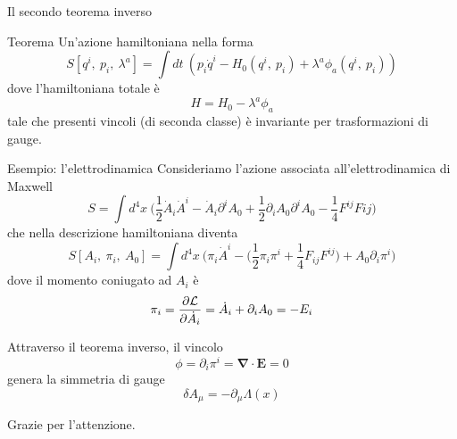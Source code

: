 \begin{frame}{Il secondo teorema inverso}
    \begin{block}{Teorema}
        Un'azione hamiltoniana nella forma
    \begin{equation*} 
        S[q^i,~p_i,~\lambda^a] = \int dt ~ (p_i \dot q^i - H_0(q^i, ~p_i) + \lambda^a \phi_a (q^i, ~p_i))
    \end{equation*} 
        dove l'hamiltoniana totale è 
    \begin{equation*}
        H = H_0 - \lambda^a \phi_a
    \end{equation*} 
        tale che presenti vincoli (di seconda classe) è invariante per trasformazioni di gauge.
    \end{block}
\end{frame}

\begin{frame} {Esempio: l'elettrodinamica}
    Consideriamo l'azione associata all'elettrodinamica di Maxwell
    \begin{equation*}
        S = \int d^4 x ~ \Big (\frac{1}{2} \dot A_i \dot A^i - \dot A_i \partial^i A_0 + \frac{1}{2} \partial_i A_0 \partial^i A_0 - \frac{1}{4} F^{ij} F{ij} \Big )
    \end{equation*}
    che nella descrizione hamiltoniana diventa
    \begin{equation*}
        S[A_i, ~\pi_i, ~A_0] = \int d^4 x ~ \Big ( \pi_i \dot A^i - \Big ( \frac{1}{2} \pi_i \pi^i + \frac{1}{4} F_{ij} F^{ij} \Big) + A_0 \partial_i \pi^i \Big)
    \end{equation*}
    dove il momento coniugato ad $A_i$ è 
    \begin{equation*}
        \pi_i = \frac{\partial\mathcal L}{\partial\dot A_i} = \dot A_i + \partial_i A_0 = - E_i
    \end{equation*}
\end{frame}

\begin{frame}
    Attraverso il teorema inverso, il vincolo
    \begin{equation*}
        \phi = \partial_i \pi^i = \boldsymbol \nabla \cdot \mathbf E = 0
    \end{equation*}
    genera la simmetria di gauge
    \begin{equation*}
        \delta A_\mu = - \partial_\mu \Lambda(x)
    \end{equation*}
\end{frame}

\begin{frame}
   \begin{center}
        Grazie per l'attenzione.
   \end{center} 
\end{frame}

